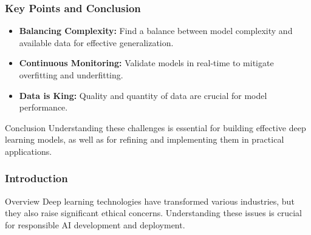 \documentclass[aspectratio=169]{beamer}
\begin{document}
\begin{frame}[fragile]
    \frametitle{Key Points and Conclusion}
    \begin{itemize}
        \item \textbf{Balancing Complexity:} Find a balance between model complexity and available data for effective generalization.
        \item \textbf{Continuous Monitoring:} Validate models in real-time to mitigate overfitting and underfitting.
        \item \textbf{Data is King:} Quality and quantity of data are crucial for model performance.
    \end{itemize}
    \begin{block}{Conclusion}
        Understanding these challenges is essential for building effective deep learning models, as well as for refining and implementing them in practical applications.
    \end{block}
\end{frame}

\begin{frame}[fragile]
    \frametitle{Introduction}
    \begin{block}{Overview}
        Deep learning technologies have transformed various industries, but they also raise significant ethical concerns. Understanding these issues is crucial for responsible AI development and deployment.
    \end{block}
\end{frame}
\end{document}
